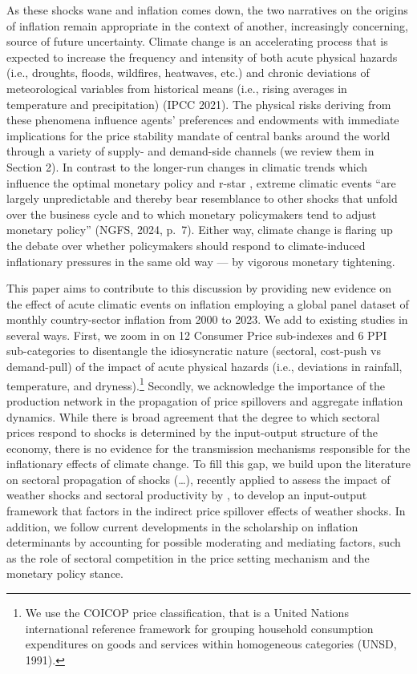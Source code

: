 \documentclass[
  letterpaper,
  DIV=11,
  numbers=noendperiod]{scrartcl}
\begin{document}
As these shocks wane and inflation comes down, the two narratives on the
origins of inflation remain appropriate in the context of another,
increasingly concerning, source of future uncertainty. Climate change is
an accelerating process that is expected to increase the frequency and
intensity of both acute physical hazards (i.e., droughts, floods,
wildfires, heatwaves, etc.) and chronic deviations of meteorological
variables from historical means (i.e., rising averages in temperature
and precipitation) (IPCC 2021). The physical risks deriving from these
phenomena influence agents' preferences and endowments with immediate
implications for the price stability mandate of central banks around the
world through a variety of supply- and demand-side channels (we review
them in Section 2). In contrast to the longer-run changes in climatic
trends which influence the optimal monetary policy and r-star
\citep{mukherjee2021}, extreme climatic events ``are largely
unpredictable and thereby bear resemblance to other shocks that unfold
over the business cycle and to which monetary policymakers tend to
adjust monetary policy'' (NGFS, 2024, p.~7). Either way, climate change
is flaring up the debate over whether policymakers should respond to
climate-induced inflationary pressures in the same old way --- by
vigorous monetary tightening.

This paper aims to contribute to this discussion by providing new
evidence on the effect of acute climatic events on inflation employing a
global panel dataset of monthly country-sector inflation from 2000 to
2023. We add to existing studies in several ways. First, we zoom in on
12 Consumer Price sub-indexes and 6 PPI sub-categories to disentangle
the idiosyncratic nature (sectoral, cost-push vs demand-pull) of the
impact of acute physical hazards (i.e., deviations in rainfall,
temperature, and dryness).\footnote{We use the COICOP price
  classification, that is a United Nations international reference
  framework for grouping household consumption expenditures on goods and
  services within homogeneous categories (UNSD, 1991).} Secondly, we
acknowledge the importance of the production network in the propagation
of price spillovers and aggregate inflation dynamics. While there is
broad agreement that the degree to which sectoral prices respond to
shocks is determined by the input-output structure of the economy, there
is no evidence for the transmission mechanisms responsible for the
inflationary effects of climate change. To fill this gap, we build upon
the literature on sectoral propagation of shocks (\ldots), recently
applied to assess the impact of weather shocks and sectoral productivity
by \citet{zappala2024}, to develop an input-output framework that
factors in the indirect price spillover effects of weather shocks. In
addition, we follow current developments in the scholarship on inflation
determinants by accounting for possible moderating and mediating
factors, such as the role of sectoral competition in the price setting
mechanism \citep{weber2023} and the monetary policy stance.
\end{document}
